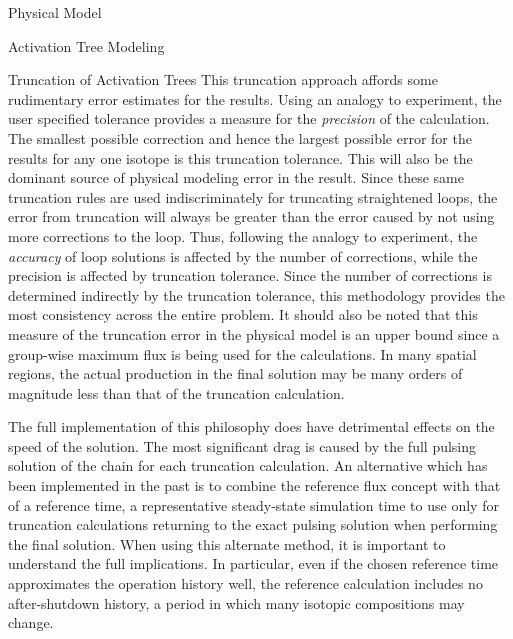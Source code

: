 \begin{chapter}{Physical Model\label{chap:physical}}
\begin{section}{Activation Tree Modeling\label{sec:physical.chains}}
\begin{subsection}{Truncation of Activation Trees\label{sec:physical.chains.trunc}}
    This truncation approach affords some rudimentary error estimates
    for the results.  Using an analogy to experiment, the user
    specified tolerance provides a measure for the \textsl{precision}
    of the calculation.  The smallest possible correction and hence
    the largest possible error for the results for any one isotope is
    this truncation tolerance.  This will also be the dominant source
    of physical modeling error in the result.  Since these same
    truncation rules are used indiscriminately for truncating
    straightened loops, the error from truncation will always be
    greater than the error caused by not using more corrections to the
    loop.  Thus, following the analogy to experiment, the
    \textsl{accuracy} of loop solutions is affected by the number of
    corrections, while the precision is affected by truncation
    tolerance.  Since the number of corrections is determined
    indirectly by the truncation tolerance, this methodology provides
    the most consistency across the entire problem.  It should also be
    noted that this measure of the truncation error in the physical
    model is an upper bound since a group-wise maximum flux is being
    used for the calculations.  In many spatial regions, the actual
    production in the final solution may be many orders of magnitude
    less than that of the truncation calculation.
    
    The full implementation of this philosophy does have detrimental
    effects on the speed of the solution.  The most significant drag
    is caused by the full pulsing solution of the chain for each
    truncation calculation.  An alternative which has been implemented
    in the past is to combine the reference flux concept with that of
    a reference time, a representative steady-state simulation time to
    use only for truncation calculations returning to the exact
    pulsing solution when performing the final solution.  When using
    this alternate method, it is important to understand the full
    implications.  In particular, even if the chosen reference time
    approximates the operation history well, the reference calculation
    includes no after-shutdown history, a period in which many
    isotopic compositions may change.
    

\end{subsection}
\end{section}
\end{chapter}
